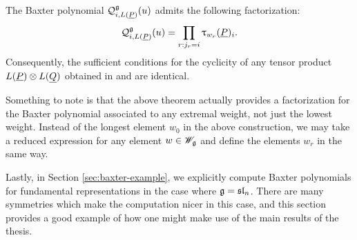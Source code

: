 \begin{theorem}\label{T:intro-main2}
    The Baxter polynomial $\mathcal{Q}_{i,L(\underline{P})}^{\mathfrak{g}}(u)$ admits the following factorization:
    \[\mathcal{Q}_{i,L(\underline{P})}^{\mathfrak{g}}(u) = \prod_{r:j_r=i}\uptau_{w_r}(\underline{P})_i.\]
    Consequently, the sufficient conditions for the cyclicity of any tensor product $L(\underline{P})\otimes L(\underline{Q})$ obtained in \cite{tan_braid_2015} and \cite{gautam_poles_2023} are identical.
\end{theorem}

Something to note is that the above theorem actually provides a factorization for the Baxter polynomial associated to any extremal weight, not just the lowest weight.
Instead of the longest element $w_0$ in the above construction, we may take a reduced expression for any element $w\in\mathscr{W}_{\mathfrak{g}}$ and define the elements $w_r$ in the same way.

Lastly, in Section \ref{sec:baxter-example}, we explicitly compute Baxter polynomials for fundamental representations in the case where $\mathfrak{g}=\mathfrak{sl}_n$.
There are many symmetries which make the computation nicer in this case, and this section provides a good example of how one might make use of the main results of the thesis.

